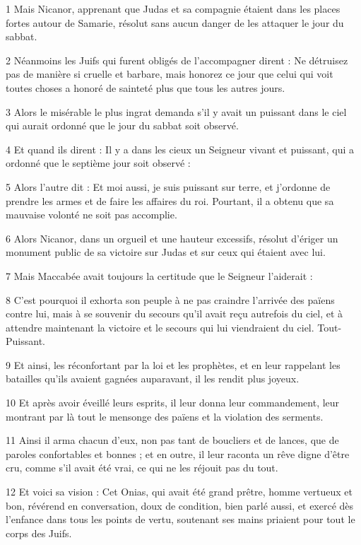 \par 1 Mais Nicanor, apprenant que Judas et sa compagnie étaient dans les places fortes autour de Samarie, résolut sans aucun danger de les attaquer le jour du sabbat.
\par 2 Néanmoins les Juifs qui furent obligés de l'accompagner dirent : Ne détruisez pas de manière si cruelle et barbare, mais honorez ce jour que celui qui voit toutes choses a honoré de sainteté plus que tous les autres jours.
\par 3 Alors le misérable le plus ingrat demanda s'il y avait un puissant dans le ciel qui aurait ordonné que le jour du sabbat soit observé.
\par 4 Et quand ils dirent : Il y a dans les cieux un Seigneur vivant et puissant, qui a ordonné que le septième jour soit observé :
\par 5 Alors l'autre dit : Et moi aussi, je suis puissant sur terre, et j'ordonne de prendre les armes et de faire les affaires du roi. Pourtant, il a obtenu que sa mauvaise volonté ne soit pas accomplie.
\par 6 Alors Nicanor, dans un orgueil et une hauteur excessifs, résolut d'ériger un monument public de sa victoire sur Judas et sur ceux qui étaient avec lui.
\par 7 Mais Maccabée avait toujours la certitude que le Seigneur l'aiderait :
\par 8 C'est pourquoi il exhorta son peuple à ne pas craindre l'arrivée des païens contre lui, mais à se souvenir du secours qu'il avait reçu autrefois du ciel, et à attendre maintenant la victoire et le secours qui lui viendraient du ciel. Tout-Puissant.
\par 9 Et ainsi, les réconfortant par la loi et les prophètes, et en leur rappelant les batailles qu'ils avaient gagnées auparavant, il les rendit plus joyeux.
\par 10 Et après avoir éveillé leurs esprits, il leur donna leur commandement, leur montrant par là tout le mensonge des païens et la violation des serments.
\par 11 Ainsi il arma chacun d'eux, non pas tant de boucliers et de lances, que de paroles confortables et bonnes ; et en outre, il leur raconta un rêve digne d'être cru, comme s'il avait été vrai, ce qui ne les réjouit pas du tout.
\par 12 Et voici sa vision : Cet Onias, qui avait été grand prêtre, homme vertueux et bon, révérend en conversation, doux de condition, bien parlé aussi, et exercé dès l'enfance dans tous les points de vertu, soutenant ses mains priaient pour tout le corps des Juifs.
